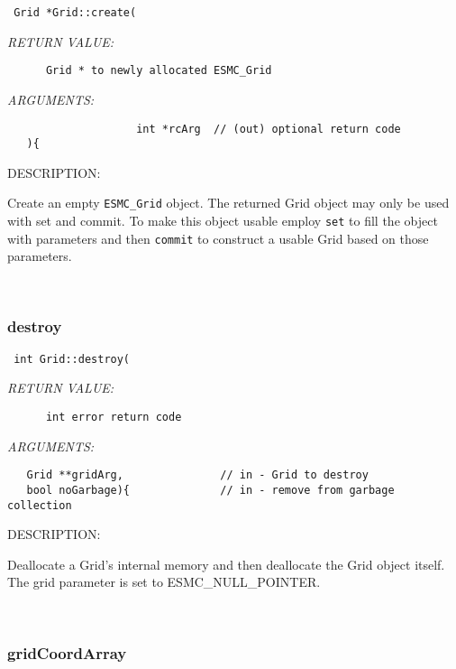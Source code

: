   
\begin{verbatim} Grid *Grid::create(\end{verbatim}{\em RETURN VALUE:}
\begin{verbatim}      Grid * to newly allocated ESMC_Grid\end{verbatim}{\em ARGUMENTS:}
\begin{verbatim}                    int *rcArg  // (out) optional return code 
   ){\end{verbatim}
{\sf DESCRIPTION:\\ }


      Create an empty {\tt ESMC\_Grid} object. The returned Grid object may
   only be used with set and commit. To make this object usable employ
   {\tt set} to fill the object with parameters and then {\tt commit} to
   construct a usable Grid based on those parameters.  
 
\mbox{}\hrulefill\ 
 
\subsubsection [destroy] {destroy}


  
\begin{verbatim} int Grid::destroy(\end{verbatim}{\em RETURN VALUE:}
\begin{verbatim}      int error return code\end{verbatim}{\em ARGUMENTS:}
\begin{verbatim}   Grid **gridArg,               // in - Grid to destroy
   bool noGarbage){              // in - remove from garbage collection\end{verbatim}
{\sf DESCRIPTION:\\ }


   Deallocate a Grid's internal memory and then deallocate the Grid object 
   itself. The grid parameter is set to ESMC_NULL_POINTER. 
   
 
\mbox{}\hrulefill\ 
 
\subsubsection [gridCoordArray] {gridCoordArray}


